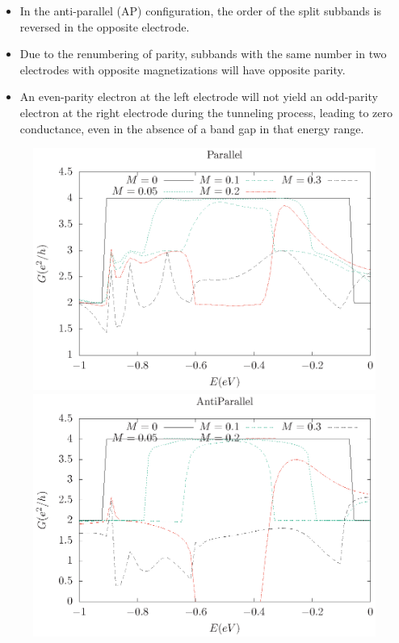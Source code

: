 \documentclass[handout,t]{beamer}
\begin{document}
\begin{frame}
	\begin{itemize}
		\item In the anti-parallel (AP) configuration, the order of the split subbands is reversed in the opposite electrode.
		\item Due to the renumbering of parity, subbands with the same number in two electrodes with opposite magnetizations will have opposite parity.
		\item An even-parity electron at the left electrode will not yield an odd-parity electron at the right electrode during the tunneling process, leading to zero conductance, even in the absence of a band gap in that energy range.
	\end{itemize}
	\begin{figure}[ht]
		\centering
		\includegraphics[width=0.45\linewidth]{../figures/armchair-parallel-conductance-1to0-revise-thesis.eps}
		\includegraphics[width=0.45\linewidth]{../figures/armchair-antiparallel-conductance-1to0-revise-thesis.eps}
	  \end{figure}
\end{frame}
			
\end{document}
